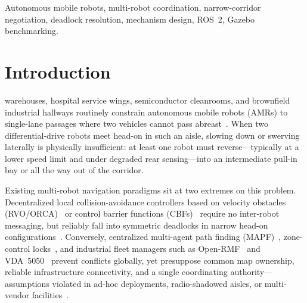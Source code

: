 \documentclass[letterpaper,journal]{IEEEtran}
\begin{document}
\begin{IEEEkeywords}
Autonomous mobile robots, multi-robot coordination, narrow-corridor negotiation, deadlock resolution, mechanism design, ROS~2, Gazebo benchmarking.
\end{IEEEkeywords}

\section{Introduction}
 warehouses, hospital service wings, semiconductor cleanrooms, and brownfield industrial hallways routinely constrain autonomous mobile robots (AMRs) to single-lane passages where two vehicles cannot pass abreast~\cite{fragapane2021planning,xiao2022barn}. When two differential-drive robots meet head-on in such an aisle, slowing down or swerving laterally is physically insufficient: at least one robot must reverse---typically at a lower speed limit and under degraded rear sensing---into an intermediate pull-in bay or all the way out of the corridor.

Existing multi-robot navigation paradigms sit at two extremes on this problem. Decentralized local collision-avoidance controllers based on velocity obstacles (RVO/ORCA)~\cite{vandenberg2011orca} or control barrier functions (CBFs)~\cite{wang2017safety,grover2023before} require no inter-robot messaging, but reliably fall into symmetric deadlocks in narrow head-on configurations~\cite{grover2023before,dergachev2021distributed,zheng2023deadlock,chandra2025deadlock}. Conversely, centralized multi-agent path finding (MAPF)~\cite{sharon2015cbs,stern2019mapf,okumura2022pibt}, zone-control locks~\cite{fanti2002event}, and industrial fleet managers such as Open-RMF~\cite{openrmf} and VDA~5050~\cite{vda5050} prevent conflicts globally, yet presuppose common map ownership, reliable infrastructure connectivity, and a single coordinating authority---assumptions violated in ad-hoc deployments, radio-shadowed aisles, or multi-vendor facilities~\cite{gautier2022negotiated,gielis2022critical}.
\end{document}
